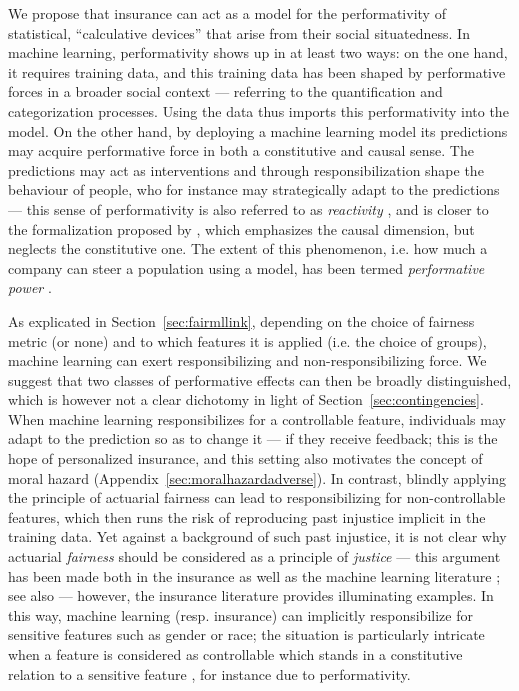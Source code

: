 \documentclass[11pt]{article} %
\makeatletter
\newcommand*{\ie}{i.e.\@\xspace}
\makeatother
\begin{document}
We propose that insurance can act as a model for the performativity of statistical, ``calculative devices'' \citep{van2014politics} that arise from their social situatedness. In machine learning, performativity shows up in at least two ways: on the one hand, it requires training data, and this training data has been shaped by performative forces in a broader social context --- referring to the quantification and categorization processes. Using the data thus imports this performativity into the model. On the other hand, by deploying a machine learning model its predictions may acquire performative force in both a constitutive and causal sense. The predictions may act as interventions and through responsibilization shape the behaviour of people, who for instance may strategically adapt to the predictions --- this sense of performativity is also referred to as \textit{reactivity} \citep{espeland2007rankings,espeland2008sociology}, and is closer to the formalization proposed by \citet{perdomo2020performative}, which emphasizes the causal dimension, but neglects the constitutive one. The extent of this phenomenon, \ie how much a company can steer a population using a model, has been termed \textit{performative power} \citep{hardt2022performative}.

As explicated in Section~\ref{sec:fairmllink}, depending on the choice of fairness metric (or none) and to which features it is applied (\ie the choice of groups), machine learning can exert responsibilizing and non-responsibilizing force. We suggest that two classes of performative effects can then be broadly distinguished, which is however not a clear dichotomy in light of Section~\ref{sec:contingencies}. When machine learning responsibilizes for a controllable feature, individuals may adapt to the prediction so as to change it --- if they receive feedback; this is the hope of personalized insurance, and this setting also motivates the concept of moral hazard (Appendix~\ref{sec:moralhazardadverse}). In contrast, blindly applying the principle of actuarial fairness can lead to responsibilizing for non-controllable features, which then runs the risk of reproducing past injustice implicit in the training data. Yet against a background of such past injustice, it is not clear why actuarial \textit{fairness} should be considered as a principle of \textit{justice} --- this argument has been made both in the insurance \citep{daniels1990insurability,lehtonen2015producing,barry2020insurance} as well as the machine learning literature \citep{mitchell2021algorithmic,vredenburghfairness,green2022escaping,kasirzadeh2022algorithmic}; see also \citep{eidelson2021patterned} --- however, the insurance literature provides illuminating examples. In this way, machine learning (resp.\@\xspace insurance) can implicitly responsibilize for sensitive features such as gender or race; the situation is particularly intricate when a feature is considered as controllable which stands in a constitutive relation to a sensitive feature \citep{hu2020s}, for instance due to performativity.
\end{document}
